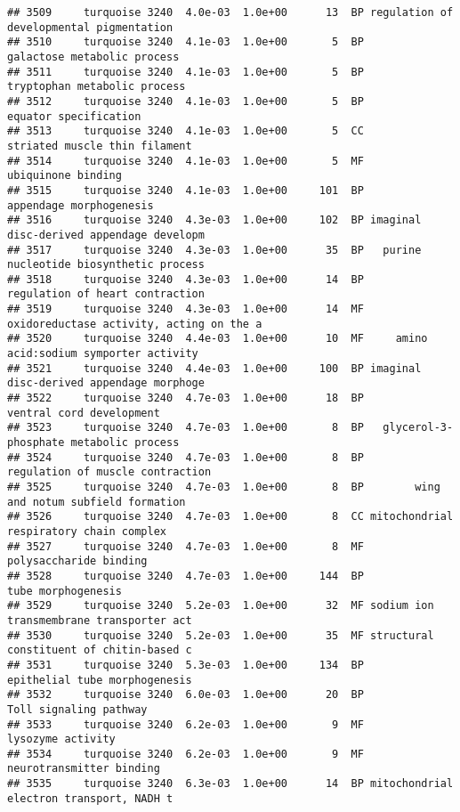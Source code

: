 \documentclass[]{article}
\begin{document}
\begin{verbatim}
## 3509     turquoise 3240  4.0e-03  1.0e+00      13  BP regulation of developmental pigmentation
## 3510     turquoise 3240  4.1e-03  1.0e+00       5  BP              galactose metabolic process
## 3511     turquoise 3240  4.1e-03  1.0e+00       5  BP             tryptophan metabolic process
## 3512     turquoise 3240  4.1e-03  1.0e+00       5  BP                    equator specification
## 3513     turquoise 3240  4.1e-03  1.0e+00       5  CC            striated muscle thin filament
## 3514     turquoise 3240  4.1e-03  1.0e+00       5  MF                       ubiquinone binding
## 3515     turquoise 3240  4.1e-03  1.0e+00     101  BP                  appendage morphogenesis
## 3516     turquoise 3240  4.3e-03  1.0e+00     102  BP imaginal disc-derived appendage developm
## 3517     turquoise 3240  4.3e-03  1.0e+00      35  BP   purine nucleotide biosynthetic process
## 3518     turquoise 3240  4.3e-03  1.0e+00      14  BP          regulation of heart contraction
## 3519     turquoise 3240  4.3e-03  1.0e+00      14  MF oxidoreductase activity, acting on the a
## 3520     turquoise 3240  4.4e-03  1.0e+00      10  MF     amino acid:sodium symporter activity
## 3521     turquoise 3240  4.4e-03  1.0e+00     100  BP imaginal disc-derived appendage morphoge
## 3522     turquoise 3240  4.7e-03  1.0e+00      18  BP                 ventral cord development
## 3523     turquoise 3240  4.7e-03  1.0e+00       8  BP   glycerol-3-phosphate metabolic process
## 3524     turquoise 3240  4.7e-03  1.0e+00       8  BP         regulation of muscle contraction
## 3525     turquoise 3240  4.7e-03  1.0e+00       8  BP        wing and notum subfield formation
## 3526     turquoise 3240  4.7e-03  1.0e+00       8  CC mitochondrial respiratory chain complex 
## 3527     turquoise 3240  4.7e-03  1.0e+00       8  MF                   polysaccharide binding
## 3528     turquoise 3240  4.7e-03  1.0e+00     144  BP                       tube morphogenesis
## 3529     turquoise 3240  5.2e-03  1.0e+00      32  MF sodium ion transmembrane transporter act
## 3530     turquoise 3240  5.2e-03  1.0e+00      35  MF structural constituent of chitin-based c
## 3531     turquoise 3240  5.3e-03  1.0e+00     134  BP            epithelial tube morphogenesis
## 3532     turquoise 3240  6.0e-03  1.0e+00      20  BP                   Toll signaling pathway
## 3533     turquoise 3240  6.2e-03  1.0e+00       9  MF                        lysozyme activity
## 3534     turquoise 3240  6.2e-03  1.0e+00       9  MF                 neurotransmitter binding
## 3535     turquoise 3240  6.3e-03  1.0e+00      14  BP mitochondrial electron transport, NADH t

\end{verbatim}
\end{document}
